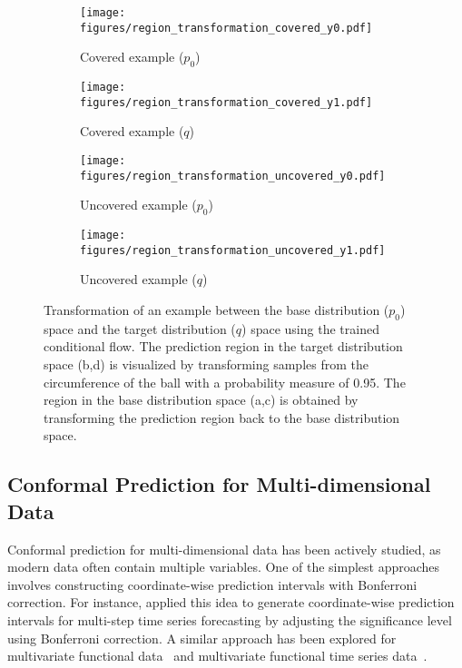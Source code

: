 \begin{figure*}[htb]
    \centering
    \begin{subfigure}[b]{0.32\textwidth}
    \texttt{[image: figures/region\_transformation\_covered\_y0.pdf]}
        \caption{Covered example ($p_0$)}
        \label{fig:covered_y0}
    \end{subfigure}
    \begin{subfigure}[b]{0.32\textwidth}
    \texttt{[image: figures/region\_transformation\_covered\_y1.pdf]}
    \caption{Covered example ($q$)}
    \label{fig:covered_y1}
    \end{subfigure}
    
    \vspace{0.5cm}
    \begin{subfigure}[b]{0.32\textwidth}
    \texttt{[image: figures/region\_transformation\_uncovered\_y0.pdf]}
        \caption{Uncovered example ($p_0$)}
        \label{fig:uncovered_y0}
    \end{subfigure}
    \begin{subfigure}[b]{0.32\textwidth}
        \texttt{[image: figures/region\_transformation\_uncovered\_y1.pdf]}
        \caption{Uncovered example ($q$)}
        \label{fig:uncovered_y1}
    \end{subfigure}
    \caption{Transformation of an example between the base distribution ($p_0$) space and the target distribution ($q$) space using the trained conditional flow. The prediction region in the target distribution space (b,d) is visualized by transforming samples from the circumference of the ball with a probability measure of 0.95. The region in the base distribution space (a,c) is obtained by transforming the prediction region back to the base distribution space.}
    \label{fig:transformation}
\end{figure*}

\subsection{Conformal Prediction for Multi-dimensional Data}

Conformal prediction for multi-dimensional data has been actively studied, as modern data often contain multiple variables. One of the simplest approaches involves constructing coordinate-wise prediction intervals with Bonferroni correction. For instance, \citet{stankeviciute2021conformal} applied this idea to generate coordinate-wise prediction intervals for multi-step time series forecasting by adjusting the significance level using Bonferroni correction. A similar approach has been explored for multivariate functional data~\cite{diquigiovanni2022conformal} and multivariate functional time series data~\cite{diquigiovanni2021distribution}.


